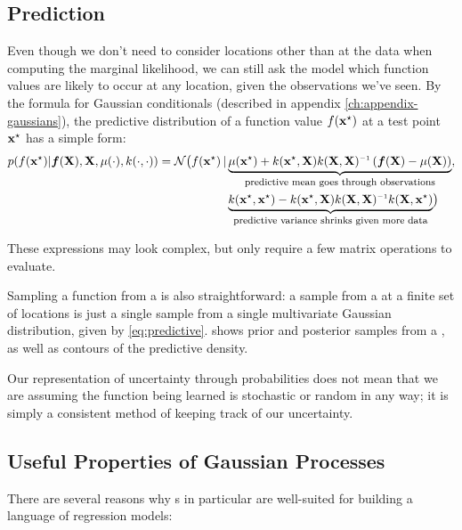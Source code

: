\subsection{Prediction}
Even though we don't need to consider locations other than at the data when computing the marginal likelihood, we can still ask the model which function values are likely to occur at any location, given the observations we've seen.
By the formula for Gaussian conditionals (described in appendix \ref{ch:appendix-gaussians}), the predictive distribution of a function value $f({\bf{x}}^\star)$ at a test point ${{\bf{x}}^\star}$ has a simple form:
%
\begin{align}
p( f(\testpoint) | \funcval, \vX, \mu(\cdot), k(\cdot, \cdot))
 = \mathcal{N} \big( f(\testpoint) \given & \underwrite{\mu(\testpoint) + k(\testpoint, \vX) k(\vX, \vX)\inv \left( \funcval - \mu(\vX) \right) }{\footnotesize predictive mean goes through observations}, \nonumber \\
 & \underwrite{k(\testpoint, \testpoint) - k(\testpoint, \vX) k(\vX, \vX)\inv k(\vX, \testpoint)}{\footnotesize predictive variance shrinks given more data}
 \big)
\label{eq:predictive}
\end{align}

These expressions may look complex, but only require a few matrix operations to evaluate.

Sampling a function from a \gp{} is also straightforward: a sample from a \gp{} at a finite set of locations is just a single sample from a single multivariate Gaussian distribution, given by \cref{eq:predictive}.
 shows prior and posterior samples from a \gp{}, as well as contours of the predictive density.

Our representation of uncertainty through probabilities does not mean that we are assuming the function being learned is stochastic or random in any way; it is simply a consistent method of keeping track of our uncertainty.



\subsection{Useful Properties of Gaussian Processes}

There are several reasons why \gp{}s in particular are well-suited for building a language of regression models:

